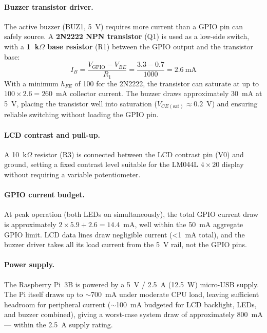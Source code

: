 \documentclass[12pt, a4paper]{report}
\begin{document}
\paragraph{Buzzer transistor driver.}
The active buzzer (BUZ1, 5~V) requires more current than a GPIO pin can
safely source. A \textbf{2N2222 NPN transistor} (Q1) is used as a
low-side switch, with a \textbf{1~k$\Omega$ base resistor} (R1) between
the GPIO output and the transistor base:
\begin{equation}
  I_B = \frac{V_{\text{GPIO}} - V_{BE}}{R_1}
      = \frac{3.3 - 0.7}{1000} = 2.6~\text{mA}
  \label{eq:base_current}
\end{equation}
With a minimum $h_{FE}$ of 100 for the 2N2222, the transistor can
saturate at up to $100 \times 2.6 = 260$~mA collector current.
The buzzer draws approximately 30~mA at 5~V, placing the transistor
well into saturation ($V_{CE(\text{sat})} \approx 0.2$~V) and ensuring
reliable switching without loading the GPIO pin.

\paragraph{LCD contrast and pull-up.}
A 10~k$\Omega$ resistor (R3) is connected between the LCD contrast pin
(V0) and ground, setting a fixed contrast level suitable for the
LM044L $4\times 20$ display without requiring a variable potentiometer.

\paragraph{GPIO current budget.}
At peak operation (both LEDs on simultaneously), the total GPIO current
draw is approximately $2 \times 5.9 + 2.6 = 14.4$~mA, well within the
50~mA aggregate GPIO limit. LCD data lines draw negligible current
(\textless{}1~mA total), and the buzzer driver takes all its load current
from the 5~V rail, not the GPIO pins.

\paragraph{Power supply.}
The Raspberry Pi~3B is powered by a 5~V / 2.5~A (12.5~W) micro-USB
supply. The Pi itself draws up to $\sim$700~mA under moderate CPU load,
leaving sufficient headroom for peripheral current ($\sim$100~mA
budgeted for LCD backlight, LEDs, and buzzer combined), giving a
worst-case system draw of approximately 800~mA --- within the 2.5~A
supply rating.
\end{document}

